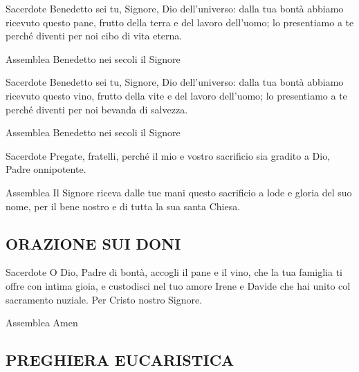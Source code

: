 \begin{dialoghi}
\item[Sacerdote] Benedetto sei tu, Signore, Dio dell'universo: dalla tua bontà abbiamo ricevuto questo pane, frutto della terra e del lavoro dell'uomo; lo presentiamo a te perché diventi per noi cibo di vita eterna.
\item[Assemblea] Benedetto nei secoli il Signore
\item[Sacerdote] Benedetto sei tu, Signore, Dio dell'universo: dalla tua bontà abbiamo ricevuto questo vino, frutto della vite e del lavoro dell'uomo; lo presentiamo a te perché diventi per noi bevanda di salvezza.
\item[Assemblea] Benedetto nei secoli il Signore
\item[Sacerdote] Pregate, fratelli, perché il mio e vostro sacrificio sia gradito a Dio, Padre onnipotente.
\item[Assemblea] Il Signore riceva dalle tue mani questo sacrificio a lode e gloria del suo nome, per il bene nostro e di tutta la sua santa Chiesa.
\end{dialoghi}

\subsection*{ORAZIONE SUI DONI}

\begin{dialoghi}
\item[Sacerdote] O Dio, Padre di bontà, accogli il pane e il vino, che la tua famiglia ti offre con intima gioia, e custodisci nel tuo amore Irene e Davide che hai unito col sacramento nuziale. Per Cristo nostro Signore.
\item[Assemblea] Amen
\end{dialoghi}

\subsection*{PREGHIERA EUCARISTICA}

